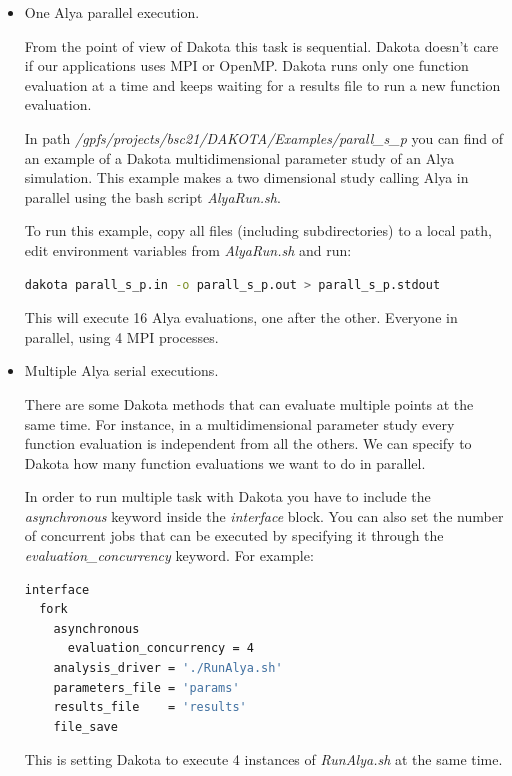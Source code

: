 \documentclass[12pt,a4paper,article]{memoir}
\begin{document}
\begin{itemize}

\item One Alya parallel execution.

From the point of view of Dakota this task is sequential. Dakota doesn't care if our applications uses MPI or OpenMP. Dakota runs only one function evaluation at a time and keeps waiting for a results file to run a new function evaluation.

In path \textit{/gpfs/projects/bsc21/DAKOTA/Examples/parall\_s\_p} you can find of an example of a Dakota multidimensional parameter study of an Alya simulation. This example makes a two dimensional study calling Alya in parallel using the bash script \textit{AlyaRun.sh}.

To run this example, copy all files (including subdirectories) to a local path, edit environment variables from \textit{AlyaRun.sh} and run:

\begin{lstlisting}[style=MyCodeStyle,language=bash]
dakota parall_s_p.in -o parall_s_p.out > parall_s_p.stdout
\end{lstlisting}

This will execute 16 Alya evaluations, one after the other. Everyone in parallel, using 4 MPI processes.


\item Multiple Alya serial executions.

There are some Dakota methods that can evaluate multiple points at the same time. For instance, in a multidimensional parameter study every function evaluation is independent from all the others. We can specify to Dakota how many function evaluations we want to do in parallel.

In order to run multiple task with Dakota you have to include the \textit{asynchronous} keyword inside the \textit{interface} block. You can also set the number of concurrent jobs that can be executed by specifying it through the \textit{evaluation\_concurrency} keyword. For example:

\begin{lstlisting}[style=MyCodeStyle,language=bash]
interface
  fork
    asynchronous
	  evaluation_concurrency = 4
    analysis_driver = './RunAlya.sh'
    parameters_file = 'params'
    results_file    = 'results'
    file_save
\end{lstlisting}

This is setting Dakota to execute 4 instances of \textit{RunAlya.sh} at the same time.


\end{itemize}
\end{document}
